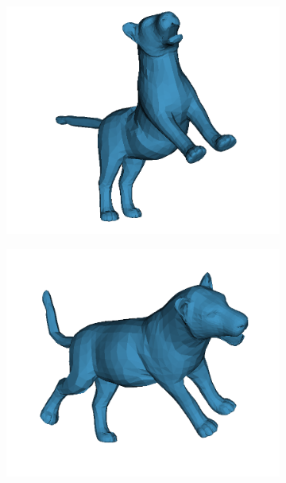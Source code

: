     \begin{figure}[H]
    \centering
    \begin{subfigure}{0.3\linewidth}
    \centering
        \includegraphics[width=1\linewidth]{smal/pose_1}
    \end{subfigure}%
    \begin{subfigure}{0.3\linewidth}
    \centering
        \includegraphics[width=1\linewidth]{smal/pose_2}
    \end{subfigure}%
    \begin{subfigure}{0.3\linewidth}

\end{subfigure}
\end{figure}
